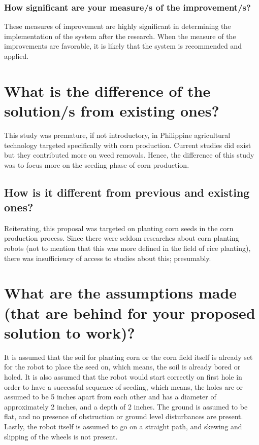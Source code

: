 		\subsubsection{How significant are your measure/s of the improvement/s?}
		These measures of improvement are highly significant in determining the implementation of the system after the research. When the measure of the improvements are favorable, it is likely that the system is recommended and applied.

\section{What is the difference of the solution/s from existing ones?}

This study was premature, if not introductory, in Philippine agricultural technology targeted specifically with corn production. Current studies did exist but they contributed more on weed removals. Hence, the difference of this study was to focus more on the seeding phase of corn production.

		\subsection{How is it different from previous and existing ones?}

Reiterating, this proposal was targeted on planting corn seeds in the corn production process. Since there were seldom researches about corn planting robots (not to mention that this was more defined in the field of rice planting), there was insufficiency of access to studies about this; presumably. 

\section{What are the assumptions made (that are behind for your proposed solution to work)?}
It is assumed that the soil for planting corn or the corn field itself is already set for the robot to place the seed on, which means, the soil is already bored or holed. It is also assumed that the robot would start correctly on first hole in order to have a successful sequence of seeding, which means, the holes are or assumed to be 5 inches apart from each other and has a diameter of approximately 2 inches, and a depth of 2 inches. The ground is assumed to be flat, and no presence of obstruction or ground level disturbances are present. Lastly, the robot itself is assumed to go on a straight path, and skewing and slipping of the wheels is not present.
	

